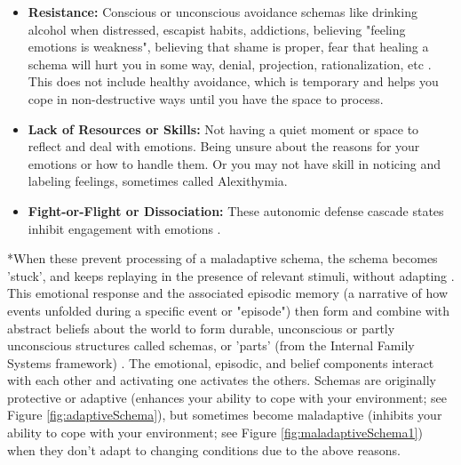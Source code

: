 \documentclass[12pt,letterpaper]{book}
\begin{document}
\begin{itemize}
    \item \textbf{Resistance:} Conscious or unconscious avoidance schemas like drinking alcohol when distressed, escapist habits, addictions, believing "feeling emotions is weakness", believing that shame is proper, fear that healing a schema will hurt you in some way, denial, projection, rationalization, etc \cite{eckerUnlocking}. This does not include healthy avoidance, which is temporary and helps you cope in non-destructive ways until you have the space to process.
    \item \textbf{Lack of Resources or Skills:} Not having a quiet moment or space to reflect and deal with emotions. Being unsure about the reasons for your emotions or how to handle them. Or you may not have skill in noticing and labeling feelings, sometimes called Alexithymia.
    \item \textbf{Fight-or-Flight or Dissociation:} These autonomic defense cascade states inhibit engagement with emotions \cite{razviPSIP}.
\end{itemize}
\label{def:schemas}
*When these prevent processing of a maladaptive schema, the schema becomes 'stuck', and keeps replaying in the presence of relevant stimuli, without adapting \cite{rachmanProcessing,eckerUnlocking}. This emotional response and the associated episodic memory (a narrative of how events unfolded during a specific event or "episode") then form and combine with abstract beliefs about the world to form durable, unconscious or partly unconscious structures called schemas, or 'parts' (from the Internal Family Systems framework) \cite{laneReconsolidation,lesswrongCoherenceTherapy}. The emotional, episodic, and belief components interact with each other and activating one activates the others. Schemas are originally protective or adaptive (enhances your ability to cope with your environment; see Figure \ref{fig:adaptiveSchema}), but sometimes become maladaptive (inhibits your ability to cope with your environment; see Figure \ref{fig:maladaptiveSchema1}) when they don't adapt to changing conditions due to the above reasons.
\end{document}
